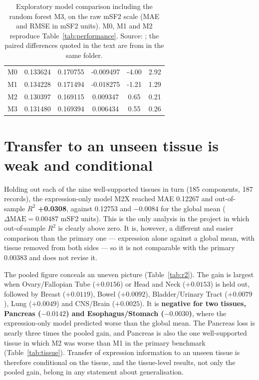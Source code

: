 \begin{table}[tbp]
  \caption[Exploratory model comparison including the random forest M3]{Exploratory model
    comparison including the random forest M3, on the raw mSF2 scale (MAE and RMSE in mSF2
    units). M0, M1 and M2 reproduce Table~\ref{tab:performance}. Source:
    ; the paired differences
    quoted in the text are from  in the same folder.}
  \label{tab:r1}
  \small
  \begin{tabular}{@{}l S[table-format=1.6] S[table-format=1.6] S[table-format=-1.6]
      S[table-format=-1.2] S[table-format=1.2]@{}}
    \toprule
     & {} & {} & {}
      & {} & {} \\
    \midrule
    M0 & 0.133624 & 0.170755 & -0.009497 & -4.00 & 2.92 \\
    M1 & 0.134228 & 0.171494 & -0.018275 & -1.21 & 1.29 \\
    M2 & 0.130397 & 0.169115 & 0.009347 & 0.65 & 0.21 \\
    M3 & 0.131480 & 0.169394 & 0.006434 & 0.55 & 0.26 \\
    \bottomrule
  \end{tabular}
\end{table}

\section{Transfer to an unseen tissue is weak and conditional}\label{sec:loto}

Holding out each of the nine well-supported tissues in turn (185 components, 187 records),
the expression-only model M2X reached MAE 0.12267 and out-of-sample $R^2$ \textbf{+0.0308},
against 0.12753 and $-0.0084$ for the global mean ($\Delta\mathrm{MAE}=0.00487$ mSF2 units).
This is the only analysis in the project in which out-of-sample $R^2$ is clearly above zero.
It is, however, a different and easier comparison than the primary one --- expression alone
against a global mean, with tissue removed from both sides --- so it is not comparable with
the primary 0.00383 and does not revise it.

The pooled figure conceals an uneven picture (Table~\ref{tab:r2}). The gain is largest when
Ovary/Fallopian Tube ($+0.0156$) or Head and Neck ($+0.0153$) is held out, followed by
Breast ($+0.0119$), Bowel ($+0.0092$), Bladder/Urinary Tract ($+0.0079$), Lung ($+0.0049$)
and CNS/Brain ($+0.0025$). It is \textbf{negative for two tissues, Pancreas ($-0.0142$) and
Esophagus/Stomach ($-0.0030$)}, where the expression-only model predicted worse than the
global mean. The Pancreas loss is nearly three times the pooled gain, and Pancreas is also
the one well-supported tissue in which M2 was worse than M1 in the primary benchmark
(Table~\ref{tab:tissue}). Transfer of expression information to an unseen tissue is
therefore conditional on the tissue, and the tissue-level results, not only the pooled
gain, belong in any statement about generalisation.

